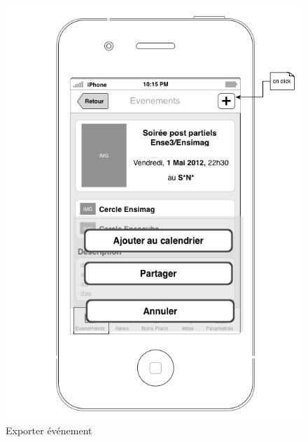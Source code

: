 \documentclass[a4paper, 11px]{article}
\begin{document}
\begin{figure}[htbp]
\begin{minipage}[c]{.50\linewidth}
\begin{center}
			\includegraphics[scale=0.3]{../../Sketch/iOS/evenements_detail_plus.png}
		\end{center}
	\caption{Exporter événement}
	\end{minipage}
\end{figure}
\end{document}
